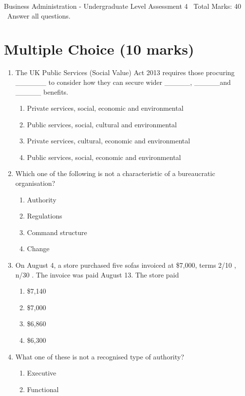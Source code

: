 \documentclass[12pt]{article}
\begin{document}
\begin{center}
Business Administration - Undergraduate Level Assessment 4 \
Total Marks: 40 \
Answer all questions.
\end{center}

\section*{Multiple Choice (10 marks)}
\begin{enumerate}[label=\arabic*.]
\item The UK Public Services (Social Value) Act 2013 requires those procuring \_\_\_\_\_\_ to consider how they can secure wider \_\_\_\_\_, \_\_\_\_\_and \_\_\_\_\_ benefits.
\begin{enumerate}[label=(\alph*)]
    \item Private services, social, economic and environmental
    \item Public services, social, cultural and environmental
    \item Private services, cultural, economic and environmental
    \item Public services, social, economic and environmental
\end{enumerate}
\item Which one of the following is not a characteristic of a bureaucratic organisation?
\begin{enumerate}[label=(\alph*)]
    \item Authority
    \item Regulations
    \item Command structure
    \item Change
\end{enumerate}
\item On August 4, a store purchased five sofas invoiced at \$7,000, terms 2/10 , n/30 . The invoice was paid August 13. The store paid
\begin{enumerate}[label=(\alph*)]
    \item \$7,140
    \item \$7,000
    \item \$6,860
    \item \$6,300
\end{enumerate}
\item What one of these is not a recognised type of authority?
\begin{enumerate}[label=(\alph*)]
    \item Executive
    \item Functional

\end{enumerate}
\end{enumerate}
\end{document}
